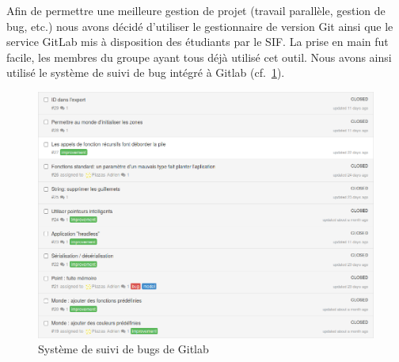 Afin de permettre une meilleure gestion de projet (travail parallèle, gestion de bug, etc.) nous avons décidé d'utiliser le gestionnaire de version Git ainsi que le service GitLab mis à disposition des étudiants par le SIF.
La prise en main fut facile, les membres du groupe ayant tous déjà utilisé cet outil. Nous avons ainsi utilisé le système de suivi de bug intégré à Gitlab (cf.~\ref{bugs}).

\begin{figure}[h]
\centering
\includegraphics[scale=0.35]{doc/gestionProjet/bugs.png}
\caption{\label{bugs} Système de suivi de bugs de Gitlab}
\end{figure}


